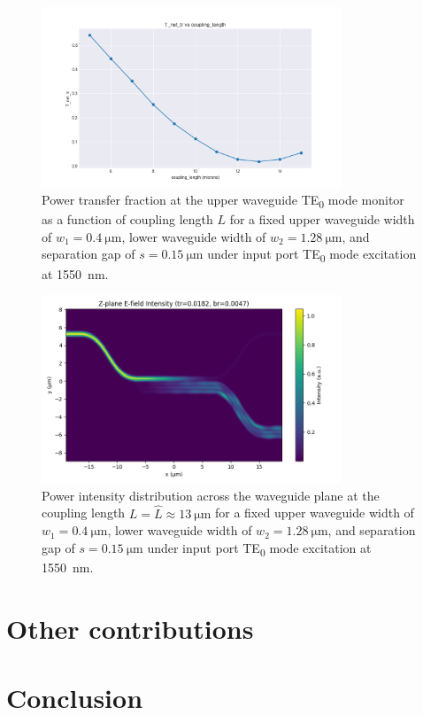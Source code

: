 \documentclass[10pt, a4paper]{article}
\begin{document}
\begin{figure}[h!]
  \centering
  \includegraphics[width=0.8\textwidth]{task3/sweep_plots/sweep_idx_8_sweep__coupling_length=5_15_11_wg1_width=0.4_wg2_width=1.28_separation=0.15_center_wavelength=1.55_T_net_tr_line.png}
  \caption{Power transfer fraction at the upper waveguide TE\textsubscript{0} mode monitor as a function of coupling length \(L\) for a fixed upper waveguide width of \(w_1=\SI{0.4}{\um}\), lower waveguide width of \(w_2=\SI{1.28}{\um}\), and separation gap of \(s=\SI{0.15}{\um}\) under input port TE\textsubscript{0} mode excitation at \SI{1550}{\nm}.}
  \label{fig:te0_te2_coupling_length}
\end{figure}
\begin{figure}[h!]
  \centering
  \includegraphics[width=0.8\textwidth]{task3/sim_1521_130625/z_plane_intensity.png}
  \caption{Power intensity distribution across the waveguide plane at the coupling length \(L=\hat{L}\approx\SI{13}{\um}\) for a fixed upper waveguide width of \(w_1=\SI{0.4}{\um}\), lower waveguide width of \(w_2=\SI{1.28}{\um}\), and separation gap of \(s=\SI{0.15}{\um}\) under input port TE\textsubscript{0} mode excitation at \SI{1550}{\nm}.}
  \label{fig:cross_mode_power_distribution}
\end{figure}



\section{Other contributions}


\section{Conclusion}


\printbibliography
\end{document}
